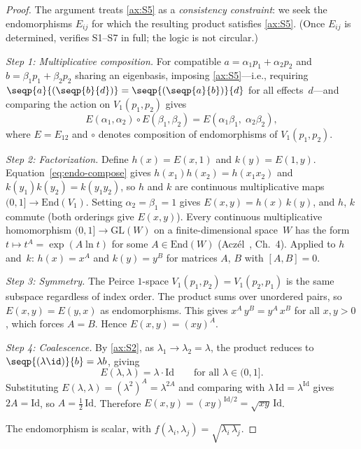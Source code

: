 \documentclass[11pt]{article}
\begin{document}
\begin{proof}
  The argument treats \ref{ax:S5} as a \emph{consistency constraint}:
  we seek the endomorphisms $E_{ij}$ for which the resulting product
  satisfies \ref{ax:S5}.
  (Once $E_{ij}$ is determined,  verifies S1--S7 in
  full; the logic is not circular.)

  \emph{Step 1: Multiplicative composition.}
  For compatible $a = \alpha_1 p_1 + \alpha_2 p_2$ and
  $b = \beta_1 p_1 + \beta_2 p_2$ sharing an eigenbasis, imposing
  \ref{ax:S5}---i.e., requiring
  $\seqp{a}{(\seqp{b}{d})} = \seqp{(\seqp{a}{b})}{d}$ for all
  effects~$d$---and comparing the action on $V_1(p_1, p_2)$ gives
  \begin{equation}\label{eq:endo-compose}
    E(\alpha_1, \alpha_2) \circ E(\beta_1, \beta_2)
    = E(\alpha_1 \beta_1,\; \alpha_2 \beta_2),
  \end{equation}
  where $E = E_{12}$ and $\circ$ denotes composition of
  endomorphisms of $V_1(p_1, p_2)$.

  \emph{Step 2: Factorization.}
  Define $h(x) = E(x, 1)$ and $k(y) = E(1, y)$.
  Equation~\eqref{eq:endo-compose} gives $h(x_1)h(x_2) = h(x_1 x_2)$
  and $k(y_1)k(y_2) = k(y_1 y_2)$, so $h$ and $k$ are continuous
  multiplicative maps $(0,1] \to \mathrm{End}(V_1)$.  Setting
  $\alpha_2 = \beta_1 = 1$ gives
  $E(x, y) = h(x)\, k(y)$, and $h$, $k$ commute (both orderings
  give $E(x, y)$).  Every continuous multiplicative homomorphism
  $(0,1] \to \mathrm{GL}(W)$ on a finite-dimensional space~$W$ has the
  form $t \mapsto t^{A} = \exp(A \ln t)$ for some
  $A \in \mathrm{End}(W)$ (Acz\'el~\cite{Aczel1966}, Ch.~4).
  Applied to $h$ and~$k$:
  $h(x) = x^{A}$ and $k(y) = y^{B}$ for matrices $A$, $B$ with
  $[A, B] = 0$.

  \emph{Step 3: Symmetry.}
  The Peirce $1$-space $V_1(p_1, p_2) = V_1(p_2, p_1)$ is the same
  subspace regardless of index order.
  The product sums over unordered pairs, so
  $E(x, y) = E(y, x)$ as endomorphisms.  This gives
  $x^A\, y^B = y^A\, x^B$ for all $x, y > 0$, which forces $A = B$.
  Hence $E(x, y) = (xy)^A$.

  \emph{Step 4: Coalescence.}
  By \ref{ax:S2}, as $\lambda_1 \to \lambda_2 = \lambda$, the product
  reduces to $\seqp{(\lambda\id)}{b} = \lambda b$, giving
  \begin{equation}\label{eq:coalescence}
    E(\lambda, \lambda) = \lambda \cdot \mathrm{Id}
    \qquad \text{for all } \lambda \in (0,1].
  \end{equation}
  Substituting $E(\lambda, \lambda) = (\lambda^2)^A = \lambda^{2A}$
  and comparing with $\lambda\, \mathrm{Id} = \lambda^{\mathrm{Id}}$
  gives $2A = \mathrm{Id}$, so $A = \tfrac{1}{2}\, \mathrm{Id}$.
  Therefore
  $E(x, y) = (xy)^{\mathrm{Id}/2}
  = \sqrt{xy}\, \mathrm{Id}$.

  The endomorphism is scalar, with
  $f(\lambda_i, \lambda_j) = \sqrt{\lambda_i\, \lambda_j}$.
\end{proof}
\end{document}
